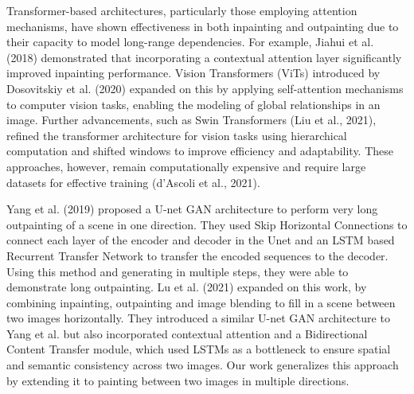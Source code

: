 \documentclass[sigconf]{acmart}
\begin{document}
Transformer-based architectures, particularly those employing attention mechanisms, have shown effectiveness in both inpainting and outpainting due to their capacity to model long-range dependencies. For example, Jiahui et al. (2018) demonstrated that incorporating a contextual attention layer significantly improved inpainting performance. Vision Transformers (ViTs) introduced by Dosovitskiy et al. (2020) expanded on this by applying self-attention mechanisms to computer vision tasks, enabling the modeling of global relationships in an image. Further advancements, such as Swin Transformers (Liu et al., 2021), refined the transformer architecture for vision tasks using hierarchical computation and shifted windows to improve efficiency and adaptability. These approaches, however, remain computationally expensive and require large datasets for effective training (d’Ascoli et al., 2021).

Yang et al. (2019) proposed a U-net GAN architecture to perform very long outpainting of a scene in one direction. They used Skip Horizontal Connections to connect each layer of the encoder and decoder in the Unet and an LSTM based Recurrent Transfer Network to transfer the encoded sequences to the decoder. Using this method and generating in multiple steps, they were able to demonstrate long outpainting. Lu et al. (2021) expanded on this work, by combining inpainting, outpainting and image blending to fill in a scene between two images horizontally. They introduced a similar U-net GAN architecture to Yang et al. but also incorporated contextual attention and a Bidirectional Content Transfer module, which used LSTMs as a bottleneck to ensure spatial and semantic consistency across two images. Our work generalizes this approach by extending it to painting between two images in multiple directions.
\end{document}
